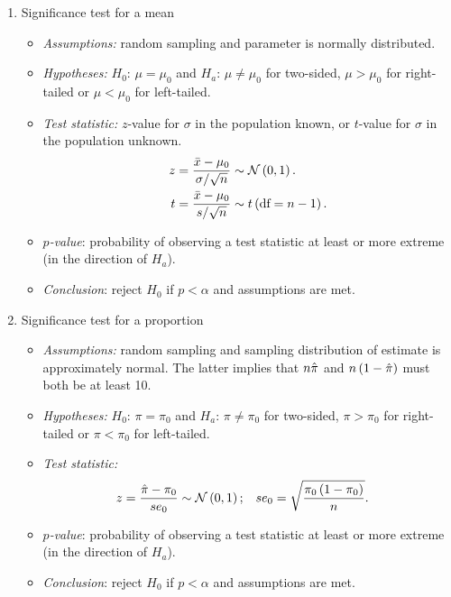 \begin{enumerate}[label=\textbf{\S~\arabic*}, ref=\S~\arabic*]
\begin{enumerate}
        \item Significance test for a mean
        \begin{itemize}
            \item \textit{Assumptions:} random sampling and parameter is normally distributed.
            \item \textit{Hypotheses:} $H_0$: $\mu=\mu_0$ and $H_a$: $\mu \ne \mu_0$ for two-sided, $\mu>\mu_0$ for right-tailed or $\mu<\mu_0$ for left-tailed.
            \item \textit{Test statistic:} $z$-value for $\sigma$ in the population known, or $t$-value for $\sigma$ in the population unknown.
            \begin{align*}
                z &= \frac{\bar{x} - \mu_0}{\sigma/\sqrt{n}} \sim \mathcal{N} \left( 0,1\right). \\
                t &= \frac{\bar{x} - \mu_0}{s/\sqrt{n}} \sim t \left( \text{df}=n-1\right).
            \end{align*}
            \item \textit{$p$-value}: probability of observing a test statistic at least or more extreme (in the direction of $H_a$). 
            \item \textit{Conclusion}: reject $H_0$ if $p<\alpha$ and assumptions are met.
        \end{itemize}
        
        \item Significance test for a proportion
        \begin{itemize}
            \item \textit{Assumptions:} random sampling and sampling distribution of estimate is approximately normal. The latter implies that $n \Hat{\pi}$ and $n \left( 1 - \Hat{\pi}\right)$ must both be at least 10.
            \item \textit{Hypotheses:} $H_0$: $\pi=\pi_0$ and $H_a$: $\pi \ne \pi_0$ for two-sided, $\pi>\pi_0$ for right-tailed or $\pi<\pi_0$ for left-tailed.
            \item \textit{Test statistic:} 
            \begin{align*}
                z &= \frac{\Hat{\pi} - \pi_0}{se_0} \sim \mathcal{N} \left( 0,1\right); &
                se_0 &= \sqrt{\frac{\pi_0 \left( 1 - \pi_0\right)}{n}}.
            \end{align*}
            \item \textit{$p$-value}: probability of observing a test statistic at least or more extreme (in the direction of $H_a$). 
            \item \textit{Conclusion}: reject $H_0$ if $p<\alpha$ and assumptions are met.
        \end{itemize}
        

\end{enumerate}
\end{enumerate}
